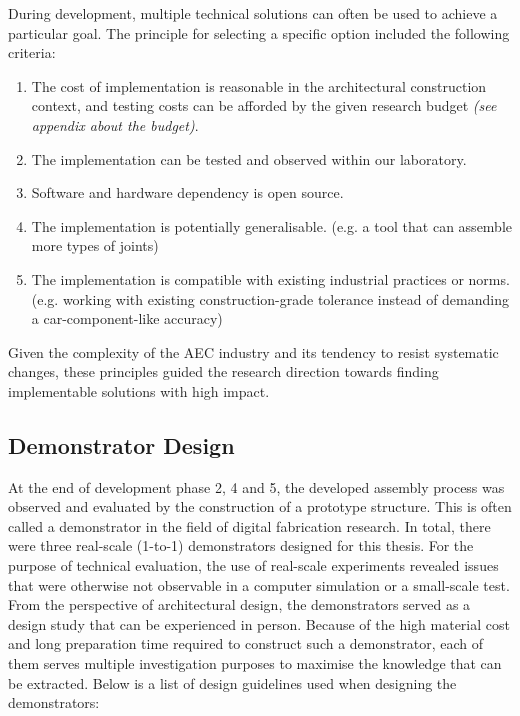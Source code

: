 During development, multiple technical solutions can often be used to achieve a particular goal. The principle for selecting a specific option included the following criteria: 

\begin{enumerate}
	\item The cost of implementation is reasonable in the architectural construction context, and testing costs can be afforded by the given research budget \textit{(see appendix about the budget)}.

	\item The implementation can be tested and observed within our laboratory.

	\item Software and hardware dependency is open source.

	\item The implementation is potentially generalisable. (e.g. a tool that can assemble more types of joints)

	\item The implementation is compatible with existing industrial practices or norms. (e.g. working with existing construction-grade tolerance instead of demanding a car-component-like accuracy) 

\end{enumerate}
Given the complexity of the AEC industry and its tendency to resist systematic changes, these principles guided the research direction towards finding implementable solutions with high impact.

\subsection{Demonstrator Design}

At the end of development phase 2, 4 and 5, the developed assembly process was observed and evaluated by the construction of a prototype structure. This is often called a demonstrator in the field of digital fabrication research. In total, there were three real-scale (1-to-1) demonstrators designed for this thesis. For the purpose of technical evaluation, the use of real-scale experiments revealed issues that were otherwise not observable in a computer simulation or a small-scale test. From the perspective of architectural design, the demonstrators served as a design study that can be experienced in person. Because of the high material cost and long preparation time required to construct such a demonstrator, each of them serves multiple investigation purposes to maximise the knowledge that can be extracted. Below is a list of design guidelines used when designing the demonstrators:

